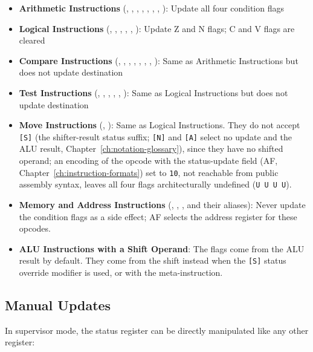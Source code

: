 \begin{itemize}
	\item \textbf{Arithmetic Instructions} (, , , , , , , ): Update all four condition flags
	\item \textbf{Logical Instructions} (, , , , , ): Update Z and N flags; C and V flags are cleared
	\item \textbf{Compare Instructions} (, , , ,
	      , , , ): Same as Arithmetic Instructions but does not update destination
	\item \textbf{Test Instructions} (, , , ,
	      , ): Same as Logical Instructions but does not update destination
	\item \textbf{Move Instructions} (, ): Same as Logical Instructions. They do not accept
	      \texttt{[S]} (the shifter-result status suffix; \texttt{[N]} and \texttt{[A]} select no update and the ALU result, Chapter~\ref{ch:notation-glossary}), since they have no shifted operand; an encoding of the opcode with the status-update field (AF,
	      Chapter~\ref{ch:instruction-formats}) set to \texttt{10}, not reachable from public assembly syntax, leaves all four flags architecturally undefined (\texttt{U U U U}).
	\item \textbf{Memory and Address Instructions} (, , ,  and
	      their aliases): Never update the condition flags as a side effect; AF selects the address register for these opcodes.
	\item \textbf{ALU Instructions with a Shift Operand}: The flags come from the ALU result by default. They come from the
	      shift instead when the \texttt{[S]} status override modifier is used, or with the  meta-instruction.
\end{itemize}

\subsection{Manual Updates}
\label{sec:sr-manual-updates}

In supervisor mode, the status register can be directly manipulated like any other register:

